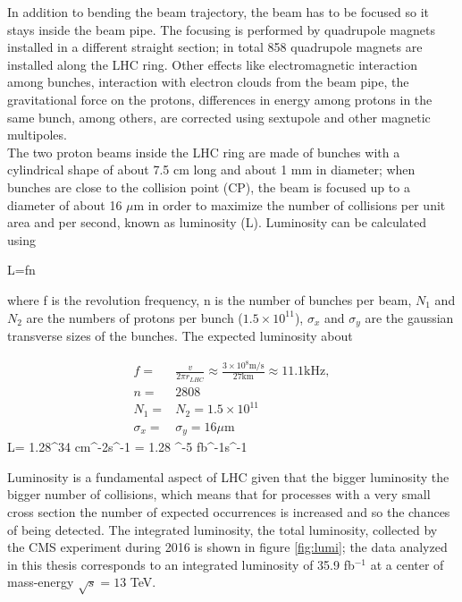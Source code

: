 \noindent In addition to bending the beam trajectory, the beam has to be focused so it stays inside the beam pipe. The focusing is performed by quadrupole magnets installed in a different straight section; in total 858 quadrupole magnets are installed along the LHC ring. Other effects like electromagnetic interaction among bunches, interaction with electron clouds from the beam pipe, the gravitational force on the protons, differences in energy among protons in the same bunch, among others, are corrected using sextupole and other magnetic multipoles.\\

\noindent The two proton beams inside the LHC ring are made of bunches with a cylindrical shape of about 7.5 cm long and about 1 mm in diameter; when bunches are close to the collision point (CP), the beam is focused up to a diameter of about 16 $\mu$m in order to maximize the number of collisions per unit area and per second, known as luminosity (L). Luminosity can be calculated using

\beqn
L=fn
\eeqn

\noindent where f is the revolution frequency, n is the number of bunches per beam,  $N_1$ and $N_2$ are the numbers of protons per bunch ($1.5\times 10^{11}$),  $\sigma_x$ and $\sigma_y$ are the gaussian transverse sizes of the bunches. The expected luminosity about  

\begin{align}
  f=&\frac{v}{2\pi r_{LHC}}\approx\frac{3\times10^8\textrm{m/s}}{27\textrm{km}}\approx 11.1 \textrm{kHz},\nonumber \\
  n=&2808\nonumber \\ 
  N_1=&N_2=1.5\times 10^{11}\nonumber\\
  \sigma_x=&\sigma_y=16\mu \textrm{m}\nonumber
\end{align}
\beqn
L= 1.28^{34} \textrm{cm}^{-2}\textrm{s}^{-1} = 1.28 ^{-5} \textrm{fb}^{-1}\textrm{s}^{-1}
\eeqn

\noindent Luminosity is a fundamental aspect of LHC given that the bigger luminosity the bigger number of collisions, which means that for processes with a very small cross section the number of expected occurrences is increased and so the chances of being detected. The integrated luminosity, \ie the total luminosity, collected by the CMS experiment during 2016 is shown in figure \ref{fig:lumi}; the data analyzed in this thesis corresponds to an integrated luminosity of 35.9 fb$^{-1}$ at a center of mass-energy $\sqrt{s}=13$ TeV.

